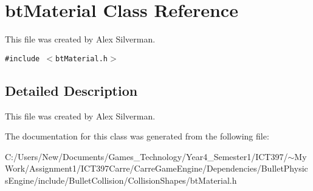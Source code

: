 \hypertarget{classbt_material}{
\section{btMaterial Class Reference}
\label{classbt_material}
}
This file was created by Alex Silverman.  


{\tt \#include $<$btMaterial.h$>$}



\subsection{Detailed Description}
This file was created by Alex Silverman. 

The documentation for this class was generated from the following file:\begin{CompactItemize}
\item 
C:/Users/New/Documents/Games\_\-Technology/Year4\_\-Semester1/ICT397/$\sim$My Work/Assignment1/ICT397Carre/CarreGameEngine/Dependencies/BulletPhysicsEngine/include/BulletCollision/CollisionShapes/btMaterial.h\end{CompactItemize}
